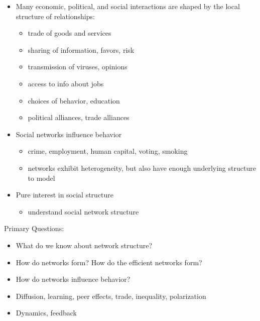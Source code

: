 \documentclass[
]{article}
\providecommand{\tightlist}{%
  \setlength{\itemsep}{0pt}\setlength{\parskip}{0pt}}
\begin{document}
\begin{itemize}
\tightlist
\item
  Many economic, political, and social interactions are shaped by the local structure of relationships:

  \begin{itemize}
  \tightlist
  \item
    trade of goods and services\\
  \item
    sharing of information, favors, risk
  \item
    transmission of viruses, opinions
  \item
    access to info about jobs
  \item
    choices of behavior, education\\
  \item
    political alliances, trade alliances
  \end{itemize}
\item
  Social networks influence behavior

  \begin{itemize}
  \tightlist
  \item
    crime, employment, human capital, voting, smoking
  \item
    networks exhibit heterogeneity, but also have enough underlying structure to model\\
  \end{itemize}
\item
  Pure interest in social structure

  \begin{itemize}
  \tightlist
  \item
    understand social network structure
  \end{itemize}
\end{itemize}

Primary Questions:

\begin{itemize}
\tightlist
\item
  What do we know about network structure?\\
\item
  How do networks form? How do the efficient networks form?
\item
  How do networks influence behavior?
\item
  Diffusion, learning, peer effects, trade, inequality, polarization\\
\item
  Dynamics, feedback
\end{itemize}
\end{document}
